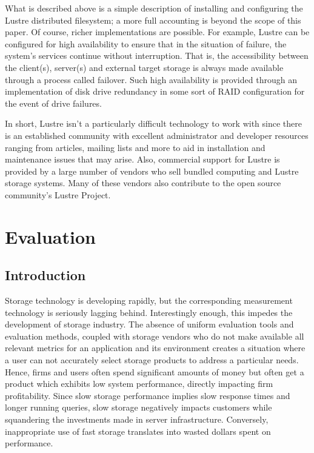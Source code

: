 \documentclass[11pt]{article}
\begin{document}
What is described above is a simple description of installing and 
configuring the Lustre distributed filesystem; a more full accounting 
is beyond the scope of this paper. Of course, richer implementations are 
possible. For example, Lustre can be configured for high availability to 
ensure that in the situation of failure, the system's services continue 
without interruption. That is, the accessibility between the client(s), 
server(s) and external target storage is always made available through 
a process called failover. Such high availability is provided through 
an implementation of disk drive redundancy in some sort of RAID 
configuration for the event of drive failures. 

In short, Lustre isn't a particularly difficult technology to work with 
since there is an established community with excellent administrator 
and developer resources ranging from articles, mailing lists and more 
to aid in installation and maintenance issues that may arise. Also, 
commercial support for Lustre is provided by a large number of vendors 
who sell bundled computing and Lustre storage systems. Many of these 
vendors also contribute to the open source community's Lustre Project. 

\section{Evaluation}
\subsection{Introduction}
Storage technology is developing rapidly, but the corresponding 
measurement technology is seriously lagging behind. Interestingly enough, 
this impedes the development of storage industry. The absence of uniform 
evaluation tools and evaluation methods, coupled with storage vendors who 
do not make available all relevant metrics for an application and its
environment creates a situation where a user can not accurately select 
storage products to address a particular needs. Hence, firms and users 
often spend significant amounts of money but often get a product which 
exhibits low system performance, directly impacting firm profitability. 
Since slow storage performance implies slow response times and longer 
running queries, slow storage negatively impacts customers while 
squandering the investments made in server infrastructure. Conversely, 
inappropriate use of fast storage translates into wasted dollars spent 
on performance.
\end{document}
